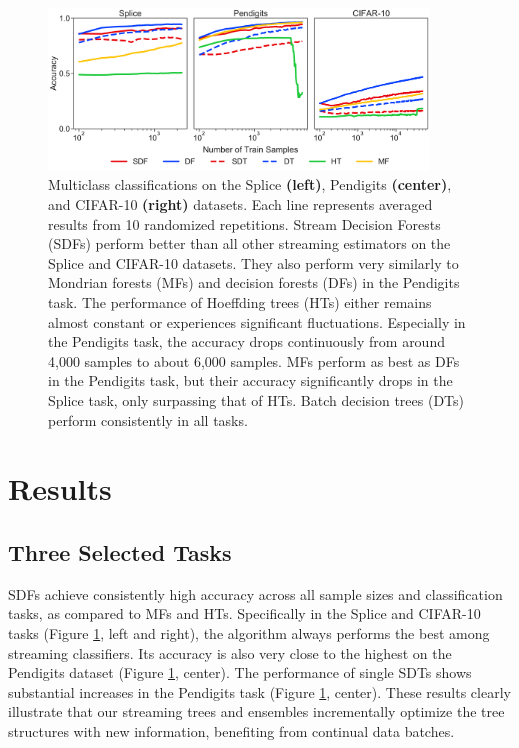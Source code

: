 \begin{figure}[!htb]
\centering
\includegraphics[width=0.9\textwidth]{select_acc}
  \caption{Multiclass classifications on the Splice \textbf{(left)}, Pendigits \textbf{(center)}, and CIFAR-10 \textbf{(right)} datasets. 
  Each line represents averaged results from 10 randomized repetitions. Stream Decision Forests (SDFs) perform better than all other streaming estimators on the Splice and CIFAR-10 datasets. They also perform very similarly to Mondrian forests (MFs) and decision forests (DFs) in the Pendigits task. The performance of Hoeffding trees (HTs) either remains almost constant or experiences significant fluctuations. Especially in the Pendigits task, the accuracy drops continuously from around 4,000 samples to about 6,000 samples. MFs perform as best as DFs in the Pendigits task, but their accuracy significantly drops in the Splice task, only surpassing that of HTs. Batch decision trees (DTs) perform consistently in all tasks.
  }
\label{fig:select_acc}
\end{figure}

\section{Results}
\label{results}

\subsection{Three Selected Tasks}
\label{results:select}
SDFs achieve consistently high accuracy across all sample sizes and classification tasks, as compared to MFs and HTs. Specifically in the Splice and CIFAR-10 tasks (Figure \ref{fig:select_acc}, left and right), the algorithm always performs the best among streaming classifiers. Its accuracy is also very close to the highest on the Pendigits dataset (Figure \ref{fig:select_acc}, center). 
The performance of single SDTs shows substantial increases in the Pendigits task (Figure \ref{fig:select_acc}, center). 
These results clearly illustrate that our streaming trees and ensembles incrementally optimize the tree structures with new information, benefiting from continual data batches.

